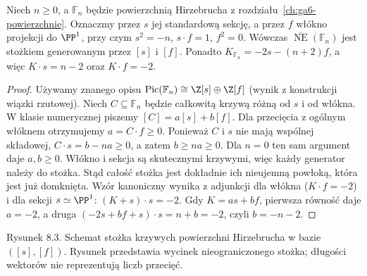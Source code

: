 \begin{stwierdzenie}
\label{st:ga8-fn-cone}
Niech $n\ge0$, a $\mathbb F_n$ będzie powierzchnią
Hirzebrucha z rozdziału~\ref{ch:ga6-powierzchnie}.
Oznaczmy przez $s$ jej standardową sekcję, a przez $f$
włókno projekcji do $\PP^1$, przy czym
$s^2=-n$, $s\cdot f=1$, $f^2=0$.
Wówczas $\overline{\operatorname{NE}}(\mathbb F_n)$
jest stożkiem generowanym przez $[s]$ i $[f]$.
Ponadto $K_{\mathbb F_n}=-2s-(n+2)f$,
a więc $K\cdot s=n-2$ oraz $K\cdot f=-2$.
\end{stwierdzenie}
\begin{proof}
Używamy znanego opisu $\operatorname{Pic}(\mathbb F_n)
\cong\Z[s]\oplus\Z[f]$ (wynik z konstrukcji
wiązki rzutowej). Niech $C\subseteq\mathbb F_n$
będzie całkowitą krzywą różną od $s$ i od włókna.
W klasie numerycznej piszemy $[C]=a[s]+b[f]$.
Dla przecięcia z ogólnym włóknem otrzymujemy
$a=C\cdot f\ge0$. Ponieważ $C$ i $s$ nie mają
wspólnej składowej, $C\cdot s=b-na\ge0$,
a zatem $b\ge na\ge0$. Dla $n=0$ ten sam argument
daje $a,b\ge0$. Włókno i sekcja są skutecznymi
krzywymi, więc każdy generator należy do stożka.
Stąd całość stożka jest dokładnie ich nieujemną
powłoką, która jest już domknięta.
Wzór kanoniczny wynika z adjunkcji dla włókna
($K\cdot f=-2$) i dla sekcji $s\simeq\PP^1$:
$(K+s)\cdot s=-2$. Gdy $K=as+bf$, pierwsza
równość daje $a=-2$, a druga $(-2s+bf+s)\cdot s
=n+b=-2$, czyli $b=-n-2$.
\end{proof}

\begin{center}

{\small Rysunek 8.3. Schemat stożka krzywych powierzchni
Hirzebrucha w bazie $([s],[f])$. Rysunek przedstawia
wycinek nieograniczonego stożka; długości wektorów
nie reprezentują liczb przecięć.}\par
\end{center}

